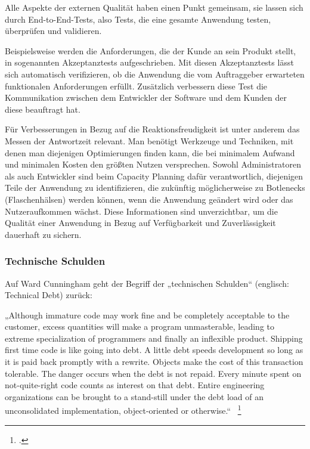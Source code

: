 Alle Aspekte der externen Qualität haben einen Punkt gemeinsam, sie lassen sich durch End-to-End-Tests, also Tests, die eine gesamte Anwendung testen, überprüfen und validieren.

Beispielsweise werden die Anforderungen, die der Kunde an sein Produkt stellt, in sogenannten Akzeptanztests aufgeschrieben. Mit diesen Akzeptanztests lässt sich automatisch verifizieren, ob die Anwendung die vom Auftraggeber erwarteten funktionalen Anforderungen erfüllt. Zusätzlich verbessern diese Test die Kommunikation zwischen dem Entwickler der Software und dem Kunden der diese beauftragt hat.

Für Verbesserungen in Bezug auf die Reaktionsfreudigkeit ist unter anderem das Messen der Antwortzeit relevant. Man benötigt Werkzeuge und Techniken, mit denen man diejenigen 
Optimierungen finden kann, die bei minimalem Aufwand und minimalen Kosten den größten Nutzen versprechen. Sowohl Administratoren als auch Entwickler sind beim Capacity Planning 
dafür verantwortlich, diejenigen Teile der Anwendung zu identifizieren, die zukünftig möglicherweise zu Botlenecks (Flaschenhälsen) werden können, wenn die Anwendung geändert wird 
oder das Nutzeraufkommen wächst. Diese Informationen sind unverzichtbar, um die Qualität einer Anwendung in Bezug auf Verfügbarkeit und Zuverlässigkeit dauerhaft zu sichern.


\subsubsection{Technische Schulden}
Auf Ward Cunningham geht der Begriff der „technischen Schulden“ (englisch: Technical Debt) zurück:

„Although immature code may work fine and be completely acceptable to the customer,
excess quantities will make a program unmasterable, leading to extreme specialization 
of programmers and finally an inflexible product. Shipping first time code is
like going into debt. A little debt speeds development so long as it is paid back promptly
with a rewrite. Objects make the cost of this transaction tolerable. The danger occurs
when the debt is not repaid. Every minute spent on not-quite-right code counts as interest
on that debt. Entire engineering organizations can be brought to a stand-still 
under the debt load of an unconsolidated implementation, object-oriented or otherwise.“ ~\footcite[]{website:ward:cunningham} %

